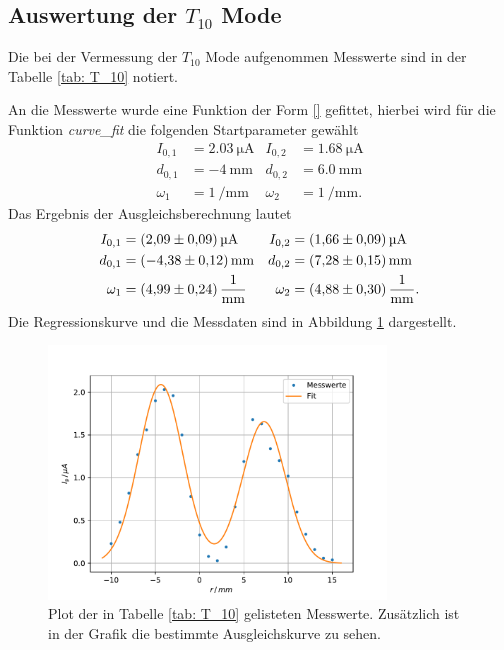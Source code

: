 \subsection{Auswertung der $T_{10}$ Mode}
\FloatBarrier
Die bei der Vermessung der $T_{10}$ Mode aufgenommen Messwerte sind in der Tabelle
\ref{tab: T_10} notiert.

An die Messwerte wurde eine Funktion der Form \eqref{} gefittet, hierbei wird für %
die Funktion \emph{curve\_fit} die folgenden Startparameter gewählt
\begin{align*}
  I_{0,1}&=\SI{2.03}{\micro\ampere} & I_{0,2}&=\SI{1.68}{\micro\ampere}\\       %
  d_{0,1}&=\SI{-4}{\milli\meter}& d_{0,2}&=\SI{6.0}{\milli\meter} \\
  \omega_1&=\SI{1}{\per\milli\meter} &   \omega_2&=\SI{1}{\per\milli\meter}.
\end{align*}
Das Ergebnis der Ausgleichsberechnung lautet
\begin{align}
  \label{eq: fit_t_10}
  \begin{aligned}
  I_{0,1}&=\SI{2.09\pm0.09}{\micro\ampere} & I_{0,2}&=\SI{1.66\pm0.09}{\micro\ampere}\\   %
  d_{0,1}&=\SI{-4.38\pm0.12}{\milli\meter}& d_{0,2}&=\SI{7.28\pm0.15}{\milli\meter} \\
  \omega_1&=\SI{4.99\pm0.24}{\per\milli\meter} &   \omega_2&=\SI{4.88\pm0.30}{\per\milli\meter}.
\end{aligned}
\end{align}
Die Regressionskurve und die Messdaten sind in Abbildung \ref{fig: T_10} dargestellt.
\begin{figure}[h!]
  \centering
  \includegraphics[width=0.8\textwidth]{../Messdaten/plots/T_10.pdf}
  \caption{Plot der in Tabelle \ref{tab: T_10} gelisteten Messwerte. Zusätzlich ist in der Grafik die bestimmte Ausgleichskurve zu sehen.}
  \label{fig: T_10}
\end{figure}
\FloatBarrier
